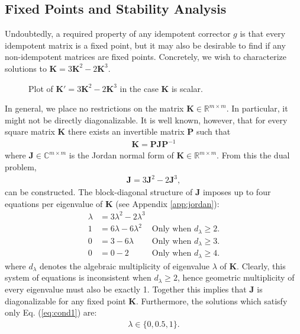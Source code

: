 \documentclass{article}
\theoremstyle{plain}
\theoremstyle{definition}
\theoremstyle{remark}
\newcommand{\vJ}{\mathbf{J}}
\newcommand{\vK}{\mathbf{K}}
\newcommand{\vP}{\mathbf{P}}
\begin{document}
\subsection{Fixed Points and Stability Analysis}
\label{sec:method-fixed-stab}
Undoubtedly, a required property of any idempotent corrector $g$ is that every idempotent matrix is a fixed point, but it may also be desirable to find if any non-idempotent matrices are fixed points. Concretely, we wish to characterize solutions to ${\vK = 3 \vK^2 - 2 \vK^3}$.

\begin{figure}[h]
    \centering
    \caption{Plot of $\vK' = 3 \vK^2 - 2 \vK^3$ in the case $\vK$ is scalar.}
    \label{fig:plot-g}
\end{figure}

In general, we place no restrictions on the matrix ${\vK \in \mathbb{R}^{m \times m}}$. In particular, it might not be directly diagonalizable. It is well known, however, that for every square matrix $\vK$ there exists an invertible matrix $\vP$ such that
\begin{align}
    \vK = \vP \vJ \vP^{-1}
\end{align}
where $\vJ \in \mathbb{C}^{m \times m}$ is the Jordan normal form \cite{jordan-form} of ${\vK \in \mathbb{R}^{m \times m}}$. From this the dual problem,
\begin{align}
    \vJ = 3 \vJ^2 - 2 \vJ^3,
\end{align}
can be constructed. The block-diagonal structure of $\vJ$ imposes up to four equations per eigenvalue of $\vK$ (see Appendix \ref{app:jordan}):
\begin{align}
    \lambda & = 3\lambda^2 - 2\lambda^3 & \label{eq:cond1}                                   \\
    1       & = 6\lambda - 6\lambda^2   & \text{Only when $d_\lambda\geq2$.}\label{eq:cond2} \\
    0       & = 3 - 6\lambda            & \text{Only when $d_\lambda\geq3$.}\label{eq:cond3} \\
    0       & = 0 - 2                   & \text{Only when $d_\lambda\geq4$.}\label{eq:cond4}
\end{align}
where $d_\lambda$ denotes the algebraic multiplicity of eigenvalue $\lambda$ of $\vK$. Clearly, this system of equations is inconsistent when ${d_{\lambda} \geq 2}$, hence geometric multiplicity of every eigenvalue must also be exactly 1. Together this implies that $\vJ$ is diagonalizable for any fixed point $\vK$. Furthermore, the solutions which satisfy only Eq. (\ref{eq:cond1}) are:
%
\begin{align}
    \lambda \in \{0, 0.5, 1\}.
\end{align}
\end{document}
